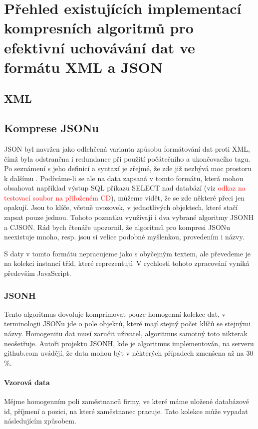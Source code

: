 \chapter{Přehled existujících implementací kompresních algoritmů pro efektivní uchovávání dat ve formátu XML a JSON}



\label{kapitolaSpecifickeAlgoritmy}

\section{XML}
\section{Komprese JSONu}
JSON byl navržen jako odlehčená varianta způsobu formátování dat proti XML, čímž byla odstraněna i redundance při použití počátečního a ukončovacího tagu. Po seznámení s jeho definicí a syntaxí je zřejmé, že zde již nezbývá moc prostoru k dalšímu . Podíváme-li se ale na data zapsaná v tomto formátu, která mohou obsahovat například výstup SQL příkazu SELECT nad databází (viz \textcolor{red}{odkaz na testovací soubor na přiloženém CD}), můžeme vidět, že se zde některé  přeci jen opakují. Jsou to klíče, včetně uvozovek, v jednotlivých objektech, které stačí zapsat pouze jednou. Tohoto poznatku využívají i dva vybrané algoritmy JSONH a CJSON. Rád bych čtenáře upozornil, že algoritmů pro kompresi JSONu neexistuje mnoho, resp. jsou si velice podobné myšlenkou, provedením i názvy.

S daty v tomto formátu nepracujeme jako s obyčejným textem, ale převedeme je na kolekci instancí tříd, které reprezentují. V rychlosti tohoto zpracování vyniká především JavaScript. 

\subsection{JSONH}
Tento algoritmus dovoluje komprimovat pouze homogenní kolekce dat, v terminologii JSONu jde o pole objektů, které mají stejný počet klíčů se stejnými názvy. Homogenitu dat musí zaručit uživatel, algoritmus samotný toto nikterak neošetřuje. Autoři projektu JSONH, kde je algoritmus implementován, na serveru github.com uvádějí, že data mohou být v některých případech zmenšena až na 30 \%.

\subsubsection{Vzorová data}
Mějme homogenním poli zaměstnanců firmy, ve které máme uložené databázové id, příjmení a pozici, na které zaměstnanec pracuje. Tato kolekce může vypadat následujícím způsobem.

